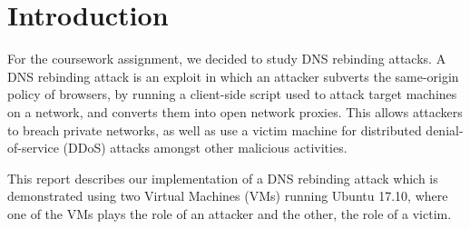 \chapter{Introduction}

For the coursework assignment, we decided to study DNS rebinding attacks.
A DNS rebinding attack is an exploit in which an attacker subverts
the same-origin policy of browsers, by running a client-side script used to
attack target machines on a network, and converts them into open network
proxies\textsuperscript{\cite{jackson2009protecting}}. This allows attackers to
breach private networks, as well as use a victim machine for distributed
denial-of-service (DDoS) attacks amongst other malicious activities.

\vspace{0.5cm}

This report describes our implementation of a DNS rebinding
attack\textsuperscript{\cite{cve20185702}} which is demonstrated using two
Virtual Machines (VMs) running Ubuntu 17.10, where one of the VMs plays the role
of an attacker and the other, the role of a victim.
